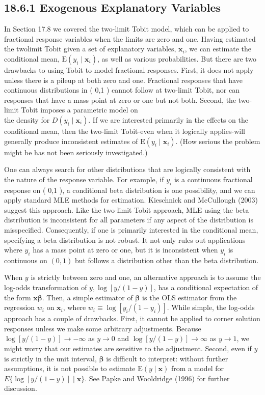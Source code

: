 \documentclass[10pt]{article}
\begin{document}
\subsection*{18.6.1 Exogenous Explanatory Variables}
In Section 17.8 we covered the two-limit Tobit model, which can be applied to fractional response variables when the limits are zero and one. Having estimated the twolimit Tobit given a set of explanatory variables, $\mathbf{x}_{i}$, we can estimate the conditional mean, $\mathrm{E}\left(y_{i} \mid \mathbf{x}_{i}\right)$, as well as various probabilities. But there are two drawbacks to using Tobit to model fractional responses. First, it does not apply unless there is a pileup at both zero and one. Fractional responses that have continuous distributions in ( 0,1 ) cannot follow at two-limit Tobit, nor can responses that have a mass point at zero or one but not both. Second, the two-limit Tobit imposes a parametric model on\\
the density for $D\left(y_{i} \mid \mathbf{x}_{i}\right)$. If we are interested primarily in the effects on the conditional mean, then the two-limit Tobit-even when it logically applies-will generally produce inconsistent estimates of $\mathrm{E}\left(y_{i} \mid \mathbf{x}_{i}\right)$. (How serious the problem might be has not been seriously investigated.)

One can always search for other distributions that are logically consistent with the nature of the response variable. For example, if $y_{i}$ is a continuous fractional response on ( 0,1 ), a conditional beta distribution is one possibility, and we can apply standard MLE methods for estimation. Kieschnick and McCullough (2003) suggest this approach. Like the two-limit Tobit approach, MLE using the beta distribution is inconsistent for all parameters if any aspect of the distribution is misspecified. Consequently, if one is primarily interested in the conditional mean, specifying a beta distribution is not robust. It not only rules out applications where $y_{i}$ has a mass point at zero or one, but it is inconsistent when $y_{i}$ is continuous on $(0,1)$ but follows a distribution other than the beta distribution.

When $y$ is strictly between zero and one, an alternative approach is to assume the log-odds transformation of $y, \log [y /(1-y)]$, has a conditional expectation of the form $\mathbf{x} \boldsymbol{\beta}$. Then, a simple estimator of $\boldsymbol{\beta}$ is the OLS estimator from the regression $w_{i}$ on $\mathbf{x}_{i}$, where $w_{i} \equiv \log \left[y_{i} /\left(1-y_{i}\right)\right]$. While simple, the log-odds approach has a couple of drawbacks. First, it cannot be applied to corner solution responses unless we make some arbitrary adjustments. Because $\log [y /(1-y)] \rightarrow-\infty$ as $y \rightarrow 0$ and $\log [y /(1-y)] \rightarrow \infty$ as $y \rightarrow 1$, we might worry that our estimates are sensitive to the adjustment. Second, even if $y$ is strictly in the unit interval, $\boldsymbol{\beta}$ is difficult to interpret: without further assumptions, it is not possible to estimate $\mathrm{E}(y \mid \mathbf{x})$ from a model for $E\{\log [y /(1-y)] \mid \mathbf{x}\}$. See Papke and Wooldridge (1996) for further discussion.
\end{document}
